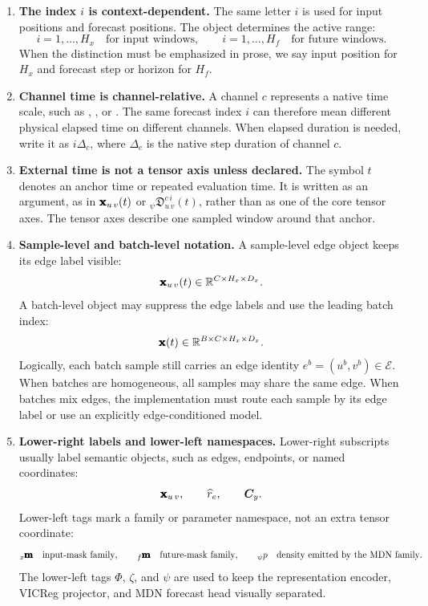 \begin{enumerate}
  \item \textbf{The index $i$ is context-dependent.}
  The same letter $i$ is used for input positions and forecast positions.  The
  object determines the active range:
  \[
    i=1,\ldots,H_x
    \quad\text{for input windows},\qquad
    i=1,\ldots,H_f
    \quad\text{for future windows}.
  \]
  When the distinction must be emphasized in prose, we say input position for
  $H_x$ and forecast step or horizon for $H_f$.

  \item \textbf{Channel time is channel-relative.}
  A channel $c$ represents a native time scale, such as ,
  , or .  The same forecast index $i$ can therefore mean
  different physical elapsed time on different channels.  When elapsed duration
  is needed, write it as $i\Delta_c$, where $\Delta_c$ is the native step
  duration of channel $c$.

  \item \textbf{External time is not a tensor axis unless declared.}
  The symbol $t$ denotes an anchor time or repeated evaluation time.  It is
  written as an argument, as in $\pmb{\mathbf{x}}_{u\,v}(t)$ or
  ${}_{\psi}\mathfrak{D}_{u\,v}^{c\,i}(t)$, rather than as one of the core
  tensor axes.  The tensor axes describe one sampled window around that anchor.

  \item \textbf{Sample-level and batch-level notation.}
  A sample-level edge object keeps its edge label visible:
  \[
    \pmb{\mathbf{x}}_{u\,v}(t)\in\mathbb{R}^{C\times H_x\times D_x}.
  \]
  A batch-level object may suppress the edge labels and use the leading batch
  index:
  \[
    \pmb{\mathbf{x}}(t)\in\mathbb{R}^{B\times C\times H_x\times D_x}.
  \]
  Logically, each batch sample still carries an edge identity
  $e^b=(u^b,v^b)\in\mathcal{E}$.  When batches are homogeneous, all samples may
  share the same edge.  When batches mix edges, the implementation must route
  each sample by its edge label or use an explicitly edge-conditioned model.

  \item \textbf{Lower-right labels and lower-left namespaces.}
  Lower-right subscripts usually label semantic objects, such as edges,
  endpoints, or named coordinates:
  \[
    \pmb{\mathbf{x}}_{u\,v},\qquad
    \widehat{r}_{e},\qquad
    \bm{C}_{y}.
  \]
  Lower-left tags mark a family or parameter namespace, not an extra tensor
  coordinate:
  \[
    {}_{x}\pmb{\mathbf{m}}
    \quad\text{input-mask family},\qquad
    {}_{f}\pmb{\mathbf{m}}
    \quad\text{future-mask family},\qquad
    {}_{\psi}p
    \quad\text{density emitted by the MDN family}.
  \]
  The lower-left tags $\Phi$, $\zeta$, and $\psi$ are used to keep the
  representation encoder, VICReg projector, and MDN forecast head visually
  separated.


\end{enumerate}
